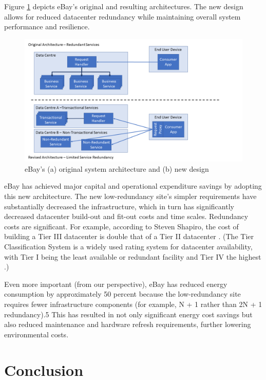 Figure \ref{figure:styles} depicts eBay's original and resulting architectures. The new design allows for reduced datacenter redundancy while maintaining overall system performance and resilience.

\begin{figure}
\centering
\includegraphics[width=\textwidth]{Figures/principles-styles}
\caption{eBay's (a) original system architecture and (b) new design}
\label{figure:styles}
\end{figure}

eBay has achieved major capital and operational expenditure savings by adopting this new architecture. The new low-redundancy site's simpler requirements have substantially decreased the infrastructure, which in turn has significantly decreased datacenter build-out and fit-out costs and time scales. Redundancy costs are significant. For example, according to Steven Shapiro, the cost of building a Tier III datacenter is double that of a Tier II datacenter \cite{shapiro2015-datacentre-mythsrealities}. (The Tier Classification System is a widely used rating system for datacenter availability, with Tier I being the least available or redundant facility and Tier IV the highest \cite{uptime2015-tierclassification}.)

Even more important (from our perspective), eBay has reduced energy consumption by approximately 50 percent because the low-redundancy site requires fewer infrastructure components (for example, N + 1 rather than 2N + 1 redundancy).5 This has resulted in not only significant energy cost savings but also reduced maintenance and hardware refresh requirements, further lowering environmental costs.

\section{Conclusion}

